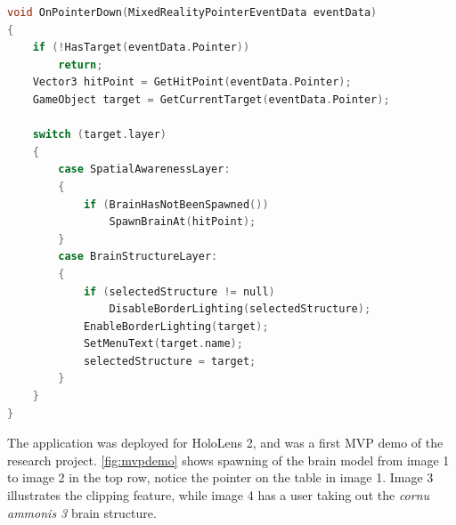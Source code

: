 \begin{lstlisting}[language=c, label={item:sudopointer}, caption={A simplified version of the event function called when a \texttt{Ponter} is clicked.}]
void OnPointerDown(MixedRealityPointerEventData eventData)
{
    if (!HasTarget(eventData.Pointer)) 
        return;
    Vector3 hitPoint = GetHitPoint(eventData.Pointer);
    GameObject target = GetCurrentTarget(eventData.Pointer);

    switch (target.layer)
    {
        case SpatialAwarenessLayer:
        {
            if (BrainHasNotBeenSpawned())
                SpawnBrainAt(hitPoint);
        }
        case BrainStructureLayer:
        {
            if (selectedStructure != null)
                DisableBorderLighting(selectedStructure);
            EnableBorderLighting(target);
            SetMenuText(target.name);
            selectedStructure = target;
        }
    }
}
\end{lstlisting}

The application was deployed for HoloLens 2, and was a first MVP demo of the research project. \autoref{fig:mvpdemo} shows spawning of the brain model from image 1 to image 2 in the top row, notice the pointer on the table in image 1. Image 3 illustrates the clipping feature, while image 4 has a user taking out the \textit{cornu ammonis 3} brain structure.

